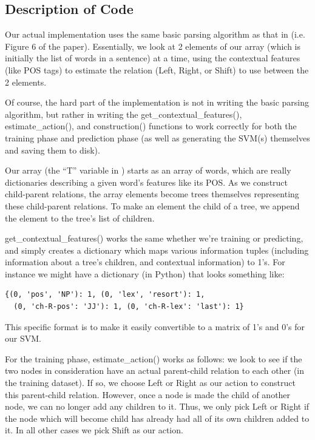 \documentclass[12pt]{amsart}
\begin{document}
\subsection{Description of Code}
Our actual implementation uses the same basic parsing algorithm as that in 
\cite{yamada2003statistical} (i.e. Figure 6 of the paper). Essentially, we look at
2 elements of our array (which is initially the list of words in a sentence)
at a time, using the contextual features (like POS tags) to estimate
the relation (Left, Right, or Shift) to use between the 2 elements. 

Of course, the hard part of the implementation is not in writing the basic 
parsing algorithm, but
rather in writing the get\_contextual\_features(), estimate\_action(),
and construction() functions
to work correctly for both the training phase and prediction phase (as well
as generating the SVM(s) themselves and saving them to disk).

Our array (the ``T'' variable in \cite{yamada2003statistical}) 
starts as an array of words, which are really
dictionaries describing a given word's features like its POS. As we construct
child-parent relations, the array elements become trees themselves representing
these child-parent relations. To make an element the child of a tree, we append 
the element to the tree's list of children.

get\_contextual\_features() works the same whether we're training or predicting,
and simply creates a dictionary which maps various information tuples 
(including information about a tree's children, and contextual information) to
1's. For instance we might have a dictionary (in Python) that looks something 
like:
\begin{verbatim}
{(0, 'pos', 'NP'): 1, (0, 'lex', 'resort'): 1,
  (0, 'ch-R-pos': 'JJ'): 1, (0, 'ch-R-lex': 'last'): 1}
\end{verbatim}
This specific format is to make it easily convertible to a matrix of 1's and 
0's for our SVM.

For the training phase, estimate\_action() works as follows: we look to see if
the two nodes in consideration have an actual parent-child relation to each 
other (in the training dataset). If so, we choose Left or Right as our action 
to construct this parent-child relation. However, once a node is made the 
child of another node, we can no longer add any children to it. Thus, we only
pick Left or Right if the node which will become child has already had all of
its own children added to it. In all other cases we pick Shift as our action.
\end{document}
